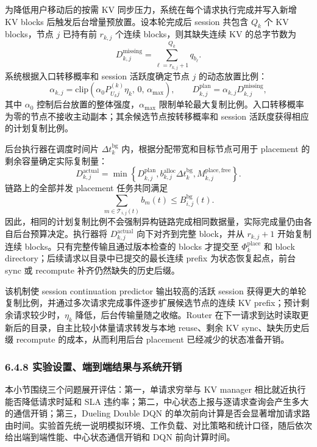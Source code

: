 为降低用户移动后的按需 KV 同步压力，系统在每个请求执行完成并写入新增 KV blocks 后触发后台增量预放置。设本轮完成后 session 共包含 \(Q_k\) 个 KV blocks，节点 \(j\) 已持有前 \(r_{k,j}\) 个连续 blocks，则其缺失连续 KV 的总字节数为
\[
D_{k,j}^{\mathrm{missing}}
=
\sum_{\ell=r_{k,j}+1}^{Q_k}q_{b_\ell}.
\]
系统根据入口转移概率和 session 活跃度确定节点 \(j\) 的动态放置比例：
\[
\alpha_{k,j}
=
\mathrm{clip}
\left(
\alpha_0 P_{U_kj}^{(k)}\eta_k,\,
0,\,
\alpha_{\max}
\right),
\qquad
D_{k,j}^{\mathrm{plan}}
=
\alpha_{k,j}D_{k,j}^{\mathrm{missing}},
\]
其中 \(\alpha_0\) 控制后台放置的整体强度，\(\alpha_{\max}\) 限制单轮最大复制比例。入口转移概率为零的节点不接收主动副本；其余候选节点按转移概率和 session 活跃度获得相应的计划复制比例。

后台执行器在调度时间片 \(\Delta t_k^{\mathrm{bg}}\) 内，根据分配带宽和目标节点可用于 placement 的剩余容量确定实际复制量：
\[
D_{k,j}^{\mathrm{actual}}
=
\min
\left\{
D_{k,j}^{\mathrm{plan}},
b_{k,j}^{\mathrm{alloc}}\Delta t_k^{\mathrm{bg}},
M_{k,j}^{\mathrm{place,free}}
\right\}.
\]
链路上的全部并发 placement 任务共同满足
\[
\sum_{m\in\mathcal T_{i,j}(t)}b_m(t)
\leq
B_{i,j}^{\mathrm{bg}}(t).
\]
因此，相同的计划复制比例不会强制异构链路完成相同数据量，实际完成量仍由各自后台预算决定。执行器将 \(D_{k,j}^{\mathrm{actual}}\) 向下对齐到完整 block，并从 \(r_{k,j}+1\) 开始复制连续 blocks。只有完整传输且通过版本检查的 blocks 才提交至 \(\Phi_k^{\mathrm{place}}\) 和 block directory；后续请求以目录中已提交的最长连续 prefix 为状态恢复起点，前台 sync 或 recompute 补齐仍然缺失的历史后缀。

该机制使 session continuation predictor 输出较高的活跃 session 获得更大的单轮复制比例，并通过多次请求完成事件逐步扩展候选节点的连续 KV prefix；预计剩余请求较少时，\(\eta_k\) 降低，后台传输量随之收缩。Router 在下一请求到达时读取更新后的目录，自主比较小体量请求转发与本地 reuse、剩余 KV sync、缺失历史后缀 recompute 的成本，从而利用后台 placement 已经减少的状态准备开销。

\subsubsection*{6.4.8 实验设置、端到端结果与系统开销}

本小节围绕三个问题展开评估：第一，单请求穷举与 KV manager 相比就近执行能否降低请求时延和 SLA 违约率；第二，中心状态上报与逐请求查询会产生多大的通信开销；第三，Dueling Double DQN 的单次前向计算是否会显著增加请求路由时间。实验首先统一说明模拟环境、工作负载、对比策略和统计口径，随后依次给出端到端性能、中心状态通信开销和 DQN 前向计算时间。

